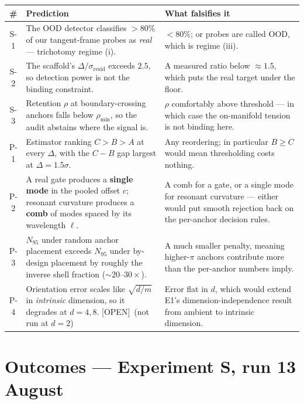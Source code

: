 \documentclass[11pt]{article}
\newcommand{\provtag}[2]{{\footnotesize\sffamily\textcolor{#1}{[#2]}}}
\newcommand{\OPENT}{\provtag{openamber}{OPEN}}
\begin{document}
\begin{table}[h]
\small
\begin{tabular}{@{}cp{}p{}@{}}
\toprule
\textbf{\sffamily \#} & \textbf{\sffamily Prediction} & \textbf{\sffamily What falsifies it}\\
\midrule
S-1 & The OOD detector classifies $> 80\%$ of our tangent-frame probes as \emph{real} ---
      trichotomy regime (i). & $< 80\%$; or probes are called OOD, which is regime (iii).\\
S-2 & The scaffold's $\Delta/\sigma_{\text{resid}}$ exceeds $2.5$, so detection power is not the
      binding constraint. & A measured ratio below $\approx 1.5$, which puts the real target
      under the floor.\\
S-3 & Retention $\rho$ at boundary-crossing anchors falls below $\rho_{\min}$, so the audit
      abstains where the signal is. & $\rho$ comfortably above threshold --- in which case the
      on-manifold tension is not binding here.\\
P-1 & Estimator ranking $C > B > A$ at every $\Delta$, with the $C - B$ gap largest at
      $\Delta = 1.5\sigma$. & Any reordering; in particular $B \ge C$ would mean thresholding
      costs nothing.\\
P-2 & A real gate produces a \textbf{single mode} in the pooled offset $c$; resonant curvature
      produces a \textbf{comb} of modes spaced by its wavelength $\ell$. & A comb for a gate, or
      a single mode for resonant curvature --- either would put smooth rejection back on the
      per-anchor decision rules.\\
P-3 & $N_{95}$ under random anchor placement exceeds $N_{95}$ under by-design placement by
      roughly the inverse shell fraction ($\sim 20\text{--}30\times$). & A much smaller
      penalty, meaning higher-$\pi$ anchors contribute more than the per-anchor numbers imply.\\
P-4 & Orientation error scales like $\sqrt{d/m}$ in \emph{intrinsic} dimension, so it degrades
      at $d = 4, 8$. \OPENT\ (not run at $d = 2$) & Error flat in $d$, which would extend E1's
      dimension-independence result from ambient to intrinsic dimension.\\
\bottomrule
\end{tabular}
\end{table}

\part{Outcomes --- Experiment S, run 13 August}
\end{document}
